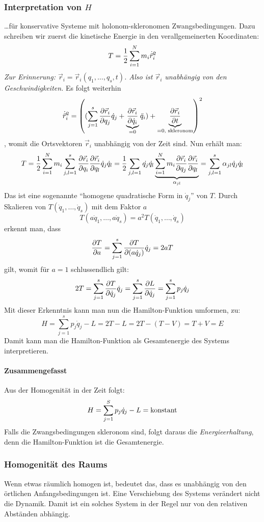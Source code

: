 \subsubsection{Interpretation von $H$} \dots für konservative Systeme mit holonom-skleronomen Zwangsbedingungen.
Dazu schreiben wir zuerst die kinetische Energie in den verallgemeinerten Koordinaten:
$$T = \frac12 \sum_{i=1}^N m_i \dot{\vec{r}}_i^2$$
\textit{Zur Erinnerung: $\vec{r}_i = \vec{r}_i(q_1, \dots, q_s, t)$. Also ist $\vec{r}_i$ unabhängig von den Geschwindigkeiten.} Es folgt weiterhin
$$\dot{\vec{r}}_i^2 = \left( (\sum_{j=1}^s \frac{\partial \vec{r}_i}{\partial q_j} \dot{q}_j + \underbrace{\frac{\partial \vec{r}_i}{\partial \dot{q}_i}}_{=0} \ddot{q}_i) + \underbrace{\frac{\partial \vec{r}_i}{\partial t}}_{=0, \text{ skleronom}}\right)^2 $$
, womit die Ortsvektoren $\vec{r}_i$ unabhängig von der Zeit sind. Nun erhält man:
$$T = \frac12 \sum_{i=1}^N m_i \sum_{j,l=1}^{s} \frac{\partial \vec{r}_i}{\partial q_i} \frac{\partial \vec{r}_i}{\partial q_l} \dot{q}_j \dot{q}_l = \frac12 \sum_{j,l = 1}^{} \dot{q_j} \dot{q_l} \underbrace{\sum_{i=1}^N m_i \frac{\partial \vec{r}_i}{\partial q_j} \frac{\partial \vec{r}_i}{\partial q_l}}_{\alpha_{jl}} = \sum_{j,l=1}^s \alpha_{jl} \dot{q}_j \dot{q}_l$$
Das ist eine sogenannte "`homogene quadratische Form in $\dot{q}_j$"' von $T$.
Durch Skalieren von $T(\dot{q}_1, \dots, \dot{q}_s)$ mit dem Faktor $a$
$$T(a \dot{q}_1, \dots, a \dot{q}_s) = a^2 T(\dot{q}_1, \dots, \dot{q}_s)$$
erkennt man, dass
$$\frac{\partial T}{\partial a} = \sum_{j=1}^s \frac{\partial T}{\partial (a \dot{q}_j)}\dot{q}_j = 2 a T$$
gilt, womit für $a = 1$ schlussendlich  gilt:
$$ 2 T = \sum_{j=1}^s \frac{\partial T}{\partial \dot{q}_j} \dot{q}_j = \sum_{j=1}^s \frac{\partial L}{\partial \dot{q}_j} = \sum_{j=1}^s p_j \dot{q}_j$$
Mit dieser Erkenntnis kann man nun die Hamilton-Funktion umformen, zu:
$$H = \sum_{j=1}^s p_j \dot{q}_j - L = 2T - L = 2 T - (T-V) = T + V = E$$
Damit kann man die Hamilton-Funktion als Gesamtenergie des Systems interpretieren.






\paragraph{Zusammengefasst}
Aus der Homogenität in der Zeit folgt:
\[H=\sum\limits_{j=1}^S p_j\dot q_j - L = \text{konstant}\]
Falls die Zwangsbedingungen skleronom sind, folgt daraus die \emph{Energieerhaltung}, denn die Hamilton-Funktion ist die Gesamtenergie.

\subsubsection{Homogenität des Raums}
Wenn etwas räumlich homogen ist, bedeutet das, dass es unabhängig von den örtlichen Anfangsbedingungen ist. Eine Verschiebung des Systems verändert nicht die Dynamik. Damit ist ein solches System in der Regel nur von den relativen Abständen abhängig.


